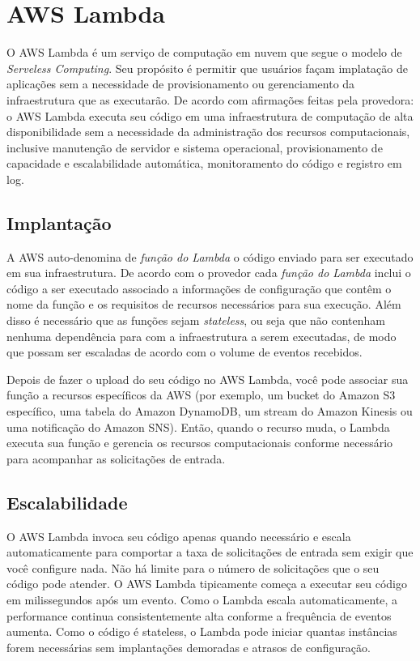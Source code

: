 \section{AWS Lambda}

O AWS Lambda é um serviço de computação em nuvem que segue o modelo de
\textit{Serveless Computing}.
Seu propósito é permitir que usuários façam implatação de aplicações sem a
necessidade de provisionamento ou gerenciamento da infraestrutura que as
executarão.
De acordo com afirmações feitas pela provedora:
o AWS Lambda executa seu código em uma infraestrutura de computação de alta
disponibilidade sem a necessidade da administração dos recursos computacionais,
inclusive manutenção de servidor e sistema operacional, provisionamento de
capacidade e escalabilidade automática, monitoramento do código e registro em
log.

\subsection{Implantação}

A AWS auto-denomina de \textit{função do Lambda} o código enviado para ser
executado em sua infraestrutura.
De acordo com o provedor cada \textit{função do Lambda} inclui o código a ser
executado associado a informações de configuração que contêm o nome da função e
os requisitos de recursos necessários para sua execução.
Além disso é necessário que as funções sejam \textit{stateless}, ou seja que
não
contenham nenhuma dependência para com a infraestrutura a serem executadas, de
modo que possam ser escaladas de acordo com o volume de eventos recebidos.

Depois de fazer o upload do seu código no AWS Lambda, você pode associar sua
função a recursos específicos da AWS (por exemplo, um bucket do Amazon S3
específico, uma tabela do Amazon DynamoDB, um stream do Amazon Kinesis ou uma
notificação do Amazon SNS). Então, quando o recurso muda, o Lambda executa sua
função e gerencia os recursos computacionais conforme necessário para
acompanhar as solicitações de entrada.

\subsection{Escalabilidade}

O AWS Lambda invoca seu código apenas quando necessário e escala
automaticamente para comportar a taxa de solicitações de entrada sem exigir que
você configure nada. Não há limite para o número de solicitações que o seu
código pode atender. O AWS Lambda tipicamente começa a executar seu código em
milissegundos após um evento. Como o Lambda escala automaticamente, a
performance continua consistentemente alta conforme a frequência de eventos
aumenta. Como o código é stateless, o Lambda pode iniciar quantas instâncias
forem necessárias sem implantações demoradas e atrasos de configuração.

